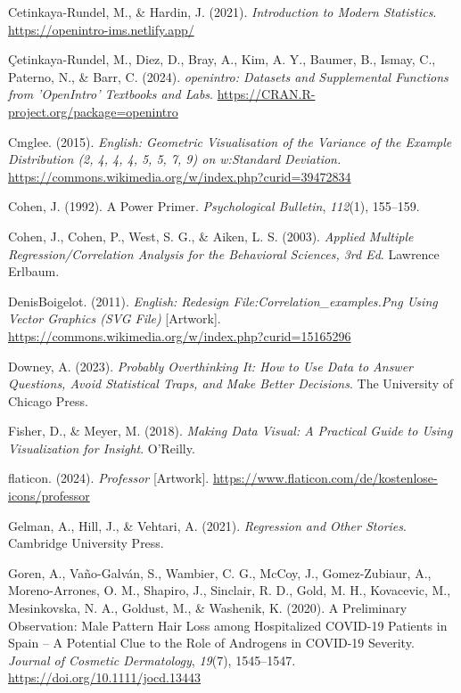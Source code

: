 \documentclass[
  letterpaper,
  twoside,
  open=any]{scrbook}
\newlength{\cslhangindent}
\newenvironment{CSLReferences}[2] %
 {\begin{list}{}{%
  \setlength{\itemindent}{0pt}
  \setlength{\leftmargin}{0pt}
  \setlength{\parsep}{0pt}
  \ifodd #1
   \setlength{\leftmargin}{\cslhangindent}
   \setlength{\itemindent}{-1\cslhangindent}
  \fi
  \setlength{\itemsep}{#2\baselineskip}}}
 {\end{list}}
\theoremstyle{definition}
\theoremstyle{definition}
\theoremstyle{definition}
\theoremstyle{remark}
\begin{document}
\begin{CSLReferences}{1}{0}
Cetinkaya-Rundel, M., \& Hardin, J. (2021). \emph{Introduction to
{Modern Statistics}}. \url{https://openintro-ims.netlify.app/}

Çetinkaya-Rundel, M., Diez, D., Bray, A., Kim, A. Y., Baumer, B., Ismay,
C., Paterno, N., \& Barr, C. (2024). \emph{openintro: Datasets and
Supplemental Functions from 'OpenIntro' Textbooks and Labs}.
\url{https://CRAN.R-project.org/package=openintro}

Cmglee. (2015). \emph{English: {Geometric} Visualisation of the Variance
of the Example Distribution (2, 4, 4, 4, 5, 5, 7, 9) on w:{Standard}
Deviation.}
\url{https://commons.wikimedia.org/w/index.php?curid=39472834}

Cohen, J. (1992). A Power Primer. \emph{Psychological Bulletin},
\emph{112}(1), 155--159.

Cohen, J., Cohen, P., West, S. G., \& Aiken, L. S. (2003). \emph{Applied
Multiple Regression/Correlation Analysis for the Behavioral Sciences,
3rd Ed}. Lawrence Erlbaum.

DenisBoigelot. (2011). \emph{English: Redesign
{File}:{Correlation}\_examples.Png Using Vector Graphics ({SVG} File)}
{[}Artwork{]}.
\url{https://commons.wikimedia.org/w/index.php?curid=15165296}

Downey, A. (2023). \emph{Probably Overthinking It: How to Use Data to
Answer Questions, Avoid Statistical Traps, and Make Better Decisions}.
The University of Chicago Press.

Fisher, D., \& Meyer, M. (2018). \emph{Making Data Visual: A Practical
Guide to Using Visualization for Insight}. O'Reilly.

flaticon. (2024). \emph{Professor} {[}Artwork{]}.
\url{https://www.flaticon.com/de/kostenlose-icons/professor}

Gelman, A., Hill, J., \& Vehtari, A. (2021). \emph{Regression and Other
Stories}. Cambridge University Press.

Goren, A., Vaño-Galván, S., Wambier, C. G., McCoy, J., Gomez-Zubiaur,
A., Moreno-Arrones, O. M., Shapiro, J., Sinclair, R. D., Gold, M. H.,
Kovacevic, M., Mesinkovska, N. A., Goldust, M., \& Washenik, K. (2020).
A Preliminary Observation: {Male} Pattern Hair Loss among Hospitalized
{COVID-19} Patients in {Spain} -- {A} Potential Clue to the Role of
Androgens in {COVID-19} Severity. \emph{Journal of Cosmetic
Dermatology}, \emph{19}(7), 1545--1547.
\url{https://doi.org/10.1111/jocd.13443}


\end{CSLReferences}
\end{document}
